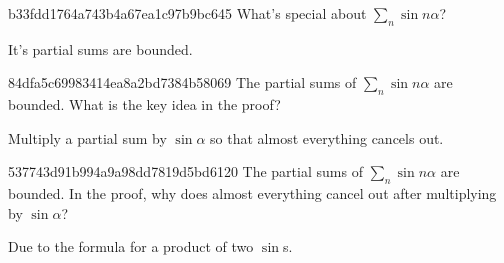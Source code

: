 \begin{note}{b33fdd1764a743b4a67ea1c97b9bc645}
    What's special about \({ \sum_n \sin n\alpha }\)?

    \begin{cloze}{1}
        It's partial sums are bounded.
    \end{cloze}
\end{note}

\begin{note}{84dfa5c69983414ea8a2bd7384b58069}
    The partial sums of \({ \sum_n \sin n\alpha }\) are bounded.
    What is the key idea in the proof?

    \begin{cloze}{1}
        Multiply a partial sum by \({ \sin \alpha }\) so that almost everything cancels out.
    \end{cloze}
\end{note}

\begin{note}{537743d91b994a9a98dd7819d5bd6120}
    The partial sums of \({ \sum_n \sin n\alpha }\) are bounded.
    In the proof, why does almost everything cancel out after multiplying by \({ \sin \alpha }\)?

    \begin{cloze}{1}
        Due to the formula for a product of two \({ \sin }\)s.
    \end{cloze}
\end{note}


